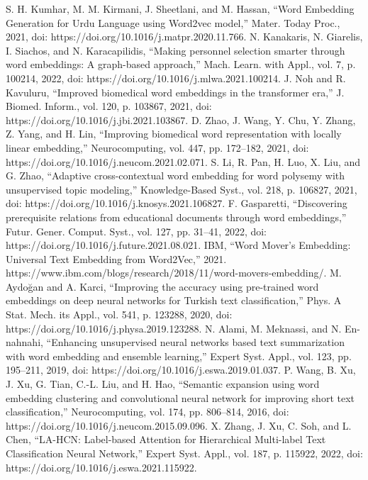 \documentclass[conference]{IEEEtran}
\begin{document}
\begin{thebibliography}{00}
 S. H. Kumhar, M. M. Kirmani, J. Sheetlani, and M. Hassan, “Word Embedding Generation for Urdu Language using Word2vec model,” Mater. Today Proc., 2021, doi: https://doi.org/10.1016/j.matpr.2020.11.766.
 N. Kanakaris, N. Giarelis, I. Siachos, and N. Karacapilidis, “Making personnel selection smarter through word embeddings: A graph-based approach,” Mach. Learn. with Appl., vol. 7, p. 100214, 2022, doi: https://doi.org/10.1016/j.mlwa.2021.100214.
 J. Noh and R. Kavuluru, “Improved biomedical word embeddings in the transformer era,” J. Biomed. Inform., vol. 120, p. 103867, 2021, doi: https://doi.org/10.1016/j.jbi.2021.103867.
 D. Zhao, J. Wang, Y. Chu, Y. Zhang, Z. Yang, and H. Lin, “Improving biomedical word representation with locally linear embedding,” Neurocomputing, vol. 447, pp. 172–182, 2021, doi: https://doi.org/10.1016/j.neucom.2021.02.071.
 S. Li, R. Pan, H. Luo, X. Liu, and G. Zhao, “Adaptive cross-contextual word embedding for word polysemy with unsupervised topic modeling,” Knowledge-Based Syst., vol. 218, p. 106827, 2021, doi: https://doi.org/10.1016/j.knosys.2021.106827.
 F. Gasparetti, “Discovering prerequisite relations from educational documents through word embeddings,” Futur. Gener. Comput. Syst., vol. 127, pp. 31–41, 2022, doi: https://doi.org/10.1016/j.future.2021.08.021.
 IBM, “Word Mover’s Embedding: Universal Text Embedding from Word2Vec,” 2021. https://www.ibm.com/blogs/research/2018/11/word-movers-embedding/.
 M. Aydoğan and A. Karci, “Improving the accuracy using pre-trained word embeddings on deep neural networks for Turkish text classification,” Phys. A Stat. Mech. its Appl., vol. 541, p. 123288, 2020, doi: https://doi.org/10.1016/j.physa.2019.123288.
 N. Alami, M. Meknassi, and N. En-nahnahi, “Enhancing unsupervised neural networks based text summarization with word embedding and ensemble learning,” Expert Syst. Appl., vol. 123, pp. 195–211, 2019, doi: https://doi.org/10.1016/j.eswa.2019.01.037.
 P. Wang, B. Xu, J. Xu, G. Tian, C.-L. Liu, and H. Hao, “Semantic expansion using word embedding clustering and convolutional neural network for improving short text classification,” Neurocomputing, vol. 174, pp. 806–814, 2016, doi: https://doi.org/10.1016/j.neucom.2015.09.096.
 X. Zhang, J. Xu, C. Soh, and L. Chen, “LA-HCN: Label-based Attention for Hierarchical Multi-label Text Classification Neural Network,” Expert Syst. Appl., vol. 187, p. 115922, 2022, doi: https://doi.org/10.1016/j.eswa.2021.115922.

\end{thebibliography}
\end{document}
